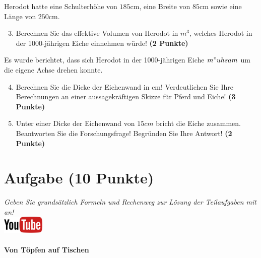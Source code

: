 \documentclass[a4paper, 10pt]{scrartcl}\usepackage[]{graphicx}\usepackage[]{xcolor}
\begin{document}
Herodot hatte eine Schulterh{\"o}he von $185$cm, eine Breite von
$85$cm sowie eine L{\"a}nge von  $250$cm.

\begin{enumerate}
  \setcounter{enumi}{2}
\item Berechnen Sie das effektive Volumen von Herodot in $m^3$, welches
  Herodot in der 1000-j{\"a}hrigen Eiche einnehmen w{\"u}rde! \textbf{(2 Punkte)}
\end{enumerate}

Es wurde berichtet, dass sich Herodot in der 1000-j{\"a}hrigen Eiche
$m{"u}hsam$ um die eigene Achse drehen konnte.

\begin{enumerate}
  \setcounter{enumi}{3}
\item Berechnen Sie die Dicke der Eichenwand in cm! Verdeutlichen Sie Ihre
  Berechnungen an einer aussagekr{\"a}ftigen Skizze f{\"u}r Pferd und Eiche! \textbf{(3 Punkte)} 
\item Unter einer Dicke der Eichenwand von $15cm$ bricht
  die Eiche zusammen. Beantworten Sie die Forschungsfrage! Begr{\"u}nden Sie
  Ihre Antwort! \textbf{(2 Punkte)} 
\end{enumerate}

\clearpage\null 
\clearpage

\section{Aufgabe \hfill (10 Punkte)}

\textit{Geben Sie grunds{\"a}tzlich Formeln und Rechenweg zur L{\"o}sung der
  Teilaufgaben mit an!} \\[1Ex]

\hfill\href{https://youtu.be/57B-yYoFSk0}{\includegraphics[width =
  2cm]{img/youtube}} %
\hspace{2Ex}

\paragraph{Von T{\"o}pfen auf Tischen}
\end{document}
